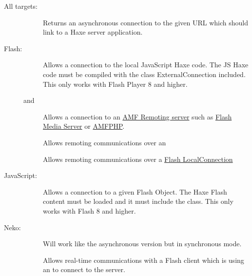 \begin{description}
	\item[All targets:]
		\begin{description}
			\item[]  
				Returns an asynchronous connection to the given URL which should link to a Haxe server application. 
		\end{description}
		
	\item[Flash:]
		\begin{description}
			\item[]  
				Allows a connection to the local JavaScript Haxe code. The JS Haxe code must be compiled with the class ExternalConnection included. This only works with Flash Player 8 and higher.
			\item[ and ]  
				Allows a connection to an \href{http://en.wikipedia.org/wiki/Action_Message_Format}{AMF Remoting server} such as \href{http://www.adobe.com/products/adobe-media-server-family.html}{Flash Media Server} or \href{http://www.silexlabs.org/amfphp/}{AMFPHP}.
			\item[]  
				Allows remoting communications over an 
			\item[]  
				Allows remoting communications over a \href{http://api.haxe.org/haxe/remoting/LocalConnection.html}{Flash LocalConnection}
		\end{description}
		
	\item[JavaScript:]
		\begin{description}
			\item[]  
				Allows a connection to a given Flash Object. The Haxe Flash content must be loaded and it must include the  class. This only works with Flash 8 and higher. 
		\end{description}
		
	\item[Neko:]
		\begin{description}
			\item[]  
				Will work like the asynchronous version but in synchronous mode.
			\item[]  
				Allows real-time communications with a Flash client which is using an  to connect to the server.
		\end{description}
\end{description}

